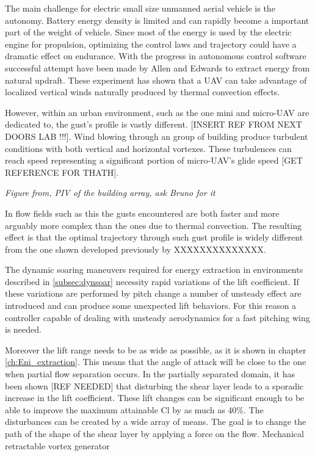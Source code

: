 
 \label{subsec:dynsoar}

\par The main challenge for electric small size unmanned aerial vehicle is the autonomy.
Battery energy density is limited and can rapidly become a important part of the weight of vehicle.
Since most of the energy is used by the electric engine for propulsion, optimizing the control laws and trajectory could have a dramatic effect on endurance. 
With the progress in autonomous control software successful attempt have been made by Allen \cite{flight_test_soaring_NASA} and Edwards \cite{flight_test_soaring_NCU} to extract energy from natural updraft.
These experiment has shown that a UAV can take advantage of localized vertical winds naturally produced by thermal convection effects.

\par However, within an urban environment, such as the one mini and micro-UAV are dedicated to, the gust's profile is vastly different. [INSERT REF FROM NEXT DOORS LAB !!!]. 
Wind blowing through an group of building produce turbulent conditions with both vertical and horizontal vortexes.
These turbulences can reach speed representing a significant portion of micro-UAV's glide speed [GET REFERENCE FOR THATH].

\par \emph{Figure from, PIV of the building array, ask Bruno for it}

\par In flow fields such as this the gusts encountered are both faster and more arguably more complex than the ones due to thermal convection.
The resulting effect is that the optimal trajectory through such gust profile is widely different from the one shown developed previously by XXXXXXXXXXXXXX.



\par The dynamic soaring maneuvers required for energy extraction in environments described in \ref{subsec:dynsoar} necessity rapid variations of the lift coefficient. 
If these variations are performed by pitch change a number of unsteady effect are introduced and can produce some unexpected lift behaviors.
For this reason a controller capable of dealing with unsteady aerodynamics for a fast pitching wing is needed.

\par Moreover the lift range needs to be as wide as possible, as it is shown in chapter \ref{ch:Eni_extraction}.
This means that the angle of attack will be close to the one when partial flow separation occurs.
In the partially separated domain, it has been shown [REF NEEDED] that disturbing the shear layer leads to a sporadic increase in the lift coefficient.
These lift changes can be significant enough to be able to improve the maximum attainable Cl by as much as 40\%.
The disturbances can be created by a wide array of means. The goal is to change the path of the shape of the shear layer by applying a force on the flow. Mechanical retractable vortex generator \cite{Onera_afc}

